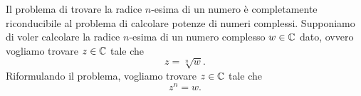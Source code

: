 Il problema di trovare la radice $n$-esima di un numero è completamente riconducibile al problema di calcolare potenze di numeri complessi. Supponiamo di voler calcolare la radice $n$-esima di un numero complesso $w \in \mathbb{C}$ dato, ovvero vogliamo trovare $z \in \mathbb{C}$ tale che \begin{equation}
    z = \sqrt[n]{w}.
\end{equation} Riformulando il problema, vogliamo trovare $z \in \mathbb{C}$ tale che \begin{equation}
    z^n = w.
\end{equation}
